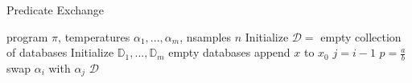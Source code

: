 \begin{algorithm}[tb]
  \caption{Predicate Exchange}
  \label{alg:predexchange}
\begin{algorithmic}
 program $\pi$, temperatures $\alpha_1, ...,\alpha_m$, nsamples $n$
\STATE Initialize $\mathcal{D} = $ empty collection of databases
\STATE Initialize $\mathbb{D}_1,...,\mathbb{D}_m$ empty databases
\REPEAT
      \STATE append $x$ to $x_0$
    \ENDIF
  \ENDFOR
    \STATE $j = i - 1$
    \STATE $p = \frac{a}{b}$
      \STATE swap $\alpha_i$ with $\alpha_j$
    \ENDIF
  \ENDFOR
{}
 $\mathcal{D}$
\end{algorithmic}
\end{algorithm}
